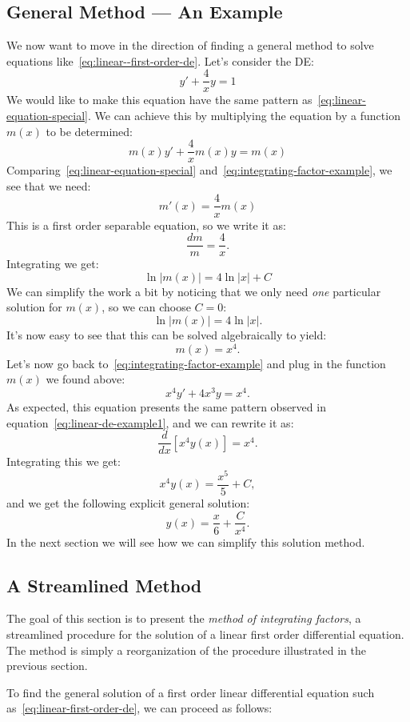 \documentclass{ximera}
\begin{document}
\subsection*{General Method --- An Example}

We now want to move in the direction of finding a general method to solve equations like~\ref{eq:linear--first-order-de}. Let's consider the DE:
\[
y'+\frac{4}{x}y=1
\]
We would like to make this equation have the same pattern as~\ref{eq:linear-equation-special}. We can achieve this by multiplying the equation by a function $m(x)$ to be determined:
\begin{equation}
\label{eq:integrating-factor-example}
m(x)y'+\frac{4}{x}m(x)y=m(x)
\end{equation}
Comparing~\ref{eq:linear-equation-special} and~\ref{eq:integrating-factor-example}, we see that we need:
\[
m'(x)=\frac{4}{x}m(x)
\]
This is a first order separable equation, so we write it as:
\[
\frac{dm}{m}=\frac{4}{x}.
\]
Integrating we get:
\[
\ln|m(x)|=4\ln|x|+C
\]
We can simplify the work a bit by noticing that we only need \emph{one} particular solution for $m(x)$, so we can choose $C=0$:
\[
\ln|m(x)|=4\ln|x|.
\]
It's now easy to see that this can be solved algebraically to yield:
\[
m(x)=x^4.
\]
Let's now go back to~\ref{eq:integrating-factor-example} and plug in the function $m(x)$ we found above:
\[
x^4y'+4x^3y=x^4.
\]
As expected, this equation presents the same pattern observed in equation~\ref{eq:linear-de-example1}, and we can rewrite it as:
\[
\frac{d}{dx}\left[x^4y(x)\right] = x^4.
\]
Integrating this we get:
\[
x^4y(x)=\frac{x^5}{5}+C,
\]
and we get the following explicit general solution:
\[
y(x)=\frac{x}{6}+\frac{C}{x^4}.
\]
In the next section we will see how we can simplify this solution method.

\subsection*{A Streamlined Method}

The goal of this section is to present the \textit{method of integrating factors}, a streamlined procedure for the solution of a linear first order differential equation. The method is simply a reorganization of the procedure illustrated in the previous section.

To find the general solution of a first order linear differential equation such as~\ref{eq:linear-first-order-de}, we can proceed as follows:
\end{document}
